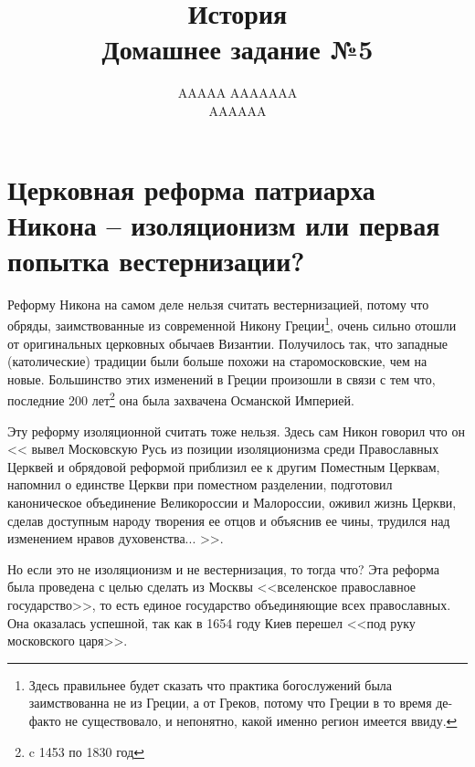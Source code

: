 \documentclass[12pt]{article}
\title{История \\ Домашнее задание №5}
\author{AAAAA AAAAAAA \\ AAAAAA}
\begin{document}
  \maketitle

  \section{Церковная реформа патриарха Никона -- изоляционизм\protect\footnotemark{} или первая попытка вестернизации\protect\footnotemark{}?}
  \addtocounter{footnote}{-2}

  Реформу Никона на самом деле нельзя считать вестернизацией, потому что обряды,
  заимствованные из современной Никону Греции\footnote{
    Здесь правильнее будет сказать что практика богослужений была заимствованна не из Греции,
    а от Греков, потому что Греции в то время де-факто не существовало,
    и непонятно, какой именно регион имеется ввиду.
  },
  очень сильно отошли от оригинальных церковных обычаев Византии.
  Получилось так, что западные (католические) традиции были больше похожи на старо\-московские, чем на новые.
  Большинство этих изменений в Греции произошли в связи с тем что,
  последние 200 лет\footnote{c 1453 по 1830 год} она была захвачена Османской Империей.

  Эту реформу изоляционной считать тоже нельзя.
  Здесь сам Никон говорил что он <<%
    вывел Московскую Русь из позиции изоляционизма среди Православных Церквей и обрядовой реформой приблизил ее к другим Поместным Церквам,
    напомнил о единстве Церкви при поместном разделении,
    подготовил каноническое объединение Великороссии и Малороссии,
    оживил жизнь Церкви, сделав доступным народу творения ее отцов и объяснив ее чины,
    трудился над изменением нравов духовенства...%
  >>.

  Но если это не изоляционизм и не вестернизация, то тогда что?
  Эта реформа была проведена с целью сделать из Москвы <<вселенское православное государство>>,
  то есть единое государство объединяющие всех православных.
  Она оказалась успешной, так как в 1654 году Киев перешел <<под руку московского царя>>.
\end{document}
